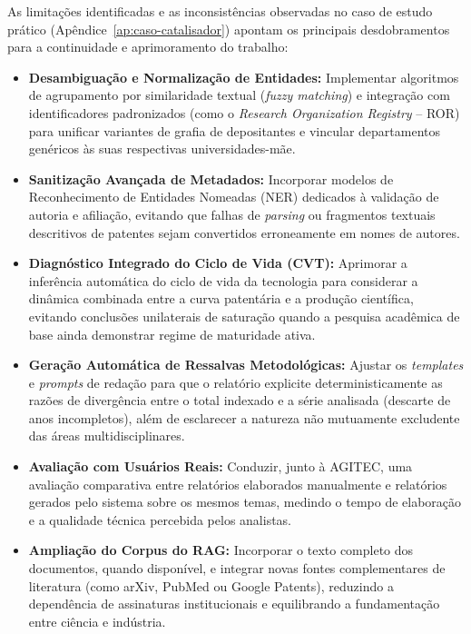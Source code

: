 \documentclass[12pt, a4paper]{article}
\begin{document}
  As limitações identificadas e as inconsistências observadas no caso de estudo prático (Apêndice~\ref{ap:caso-catalisador}) apontam os principais desdobramentos para a continuidade e aprimoramento do trabalho:

  \begin{itemize}
    \item \textbf{Desambiguação e Normalização de Entidades:} Implementar algoritmos de agrupamento por similaridade textual (\textit{fuzzy matching}) e integração com identificadores padronizados (como o \textit{Research Organization Registry} -- ROR) para unificar variantes de grafia de depositantes e vincular departamentos genéricos às suas respectivas universidades-mãe.

    \item \textbf{Sanitização Avançada de Metadados:} Incorporar modelos de Reconhecimento de Entidades Nomeadas (NER) dedicados à validação de autoria e afiliação, evitando que falhas de \textit{parsing} ou fragmentos textuais descritivos de patentes sejam convertidos erroneamente em nomes de autores.

    \item \textbf{Diagnóstico Integrado do Ciclo de Vida (CVT):} Aprimorar a inferência automática do ciclo de vida da tecnologia para considerar a dinâmica combinada entre a curva patentária e a produção científica, evitando conclusões unilaterais de saturação quando a pesquisa acadêmica de base ainda demonstrar regime de maturidade ativa.

    \item \textbf{Geração Automática de Ressalvas Metodológicas:} Ajustar os \textit{templates} e \textit{prompts} de redação para que o relatório explicite deterministicamente as razões de divergência entre o total indexado e a série analisada (descarte de anos incompletos), além de esclarecer a natureza não mutuamente excludente das áreas multidisciplinares.

    \item \textbf{Avaliação com Usuários Reais:} Conduzir, junto à AGITEC, uma avaliação comparativa entre relatórios elaborados manualmente e relatórios gerados pelo sistema sobre os mesmos temas, medindo o tempo de elaboração e a qualidade técnica percebida pelos analistas.

    \item \textbf{Ampliação do Corpus do RAG:} Incorporar o texto completo dos documentos, quando disponível, e integrar novas fontes complementares de literatura (como arXiv, PubMed ou Google Patents), reduzindo a dependência de assinaturas institucionais e equilibrando a fundamentação entre ciência e indústria.


\end{itemize}
\end{document}
